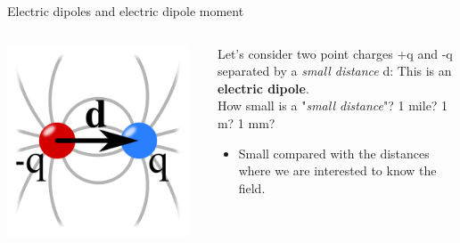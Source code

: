 \begin{frame}{Electric dipoles and electric dipole moment}

\begin{columns}
  \begin{column}{0.25\textwidth}
   \begin{center}
     \includegraphics[width=0.95\textwidth]{./images/schematics/electric_dipole_1.png}\\
   \end{center}
  \end{column}
  \begin{column}{0.75\textwidth}
     Let's consider two point charges +q and -q separated by a {\em small distance} d:
     This is an {\bf electric dipole}.\\
     \vspace{0.3cm}
     How small is a "{\em small distance}"? 1 mile? 1 m? 1 mm?
     \begin{itemize}
        \item Small compared with the distances
                 where we are interested to know the field.\\
     \end{itemize}
  \end{column}
\end{columns}


\end{frame}
